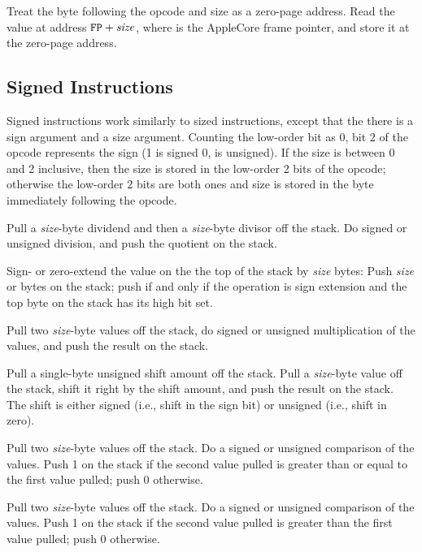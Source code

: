 \documentclass[10pt]{article}
\begin{document}
Treat the byte following the opcode and size as a zero-page
address.  Read the value at address $\texttt{FP}+\mbox{\textit{size}}$, 
where  is the AppleCore frame pointer, and store
it at the zero-page address.

\subsection{Signed Instructions}

Signed instructions work similarly to sized instructions, except that
the there is a sign argument and a size argument.  Counting the
low-order bit as 0, bit 2 of the opcode represents the sign (1 is
signed 0, is unsigned).  If the size is between 0 and 2 inclusive,
then the size is stored in the low-order 2 bits of the opcode;
otherwise the low-order 2 bits are both ones and size is stored in the
byte immediately following the opcode.

 Pull a \emph{size}-byte
dividend and then a \emph{size}-byte divisor off the stack.  Do signed
or unsigned division, and push the quotient on the stack.

 Sign- or zero-extend the
value on the the top of the stack by \emph{size} bytes: Push
\emph{size}  or  bytes on the stack; push
 if and only if the operation is sign extension and the top
byte on the stack has its high bit set.

 Pull two \emph{size}-byte
values off the stack, do signed or unsigned multiplication of the
values, and push the result on the stack.

 Pull a single-byte
unsigned shift amount off the stack.  Pull a \emph{size}-byte value
off the stack, shift it right by the shift amount, and push the result
on the stack.  The shift is either signed (i.e., shift in the sign
bit) or unsigned (i.e., shift in zero).

 Pull two
\emph{size}-byte values off the stack. Do a signed or unsigned
comparison of the values.  Push 1 on the stack if the second value
pulled is greater than or equal to the first value pulled; push 0
otherwise.

 Pull two
\emph{size}-byte values off the stack. Do a signed or unsigned
comparison of the values.  Push 1 on the stack if the second value
pulled is greater than the first value pulled; push 0 otherwise.
\end{document}
